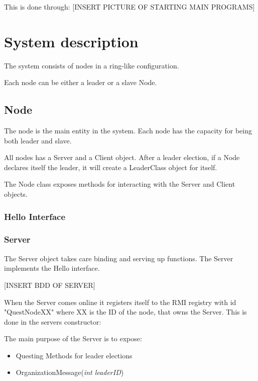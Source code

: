This is done through:
[INSERT PICTURE OF STARTING MAIN PROGRAMS]

\section{System description}
The system consists of nodes in a ring-like configuration.

Each node can be either a leader or a slave Node. 
\subsection{Node}
The node is the main entity in the system. Each node has the capacity for being both leader and slave. 

All nodes has a Server and a Client object. After a leader election, if a Node declares itself the leader, it will create a LeaderClass object for itself. 

The Node class exposes methods for interacting with the Server and Client objects.

\subsubsection{Hello Interface}

\subsubsection{Server}
The Server object takes care binding and serving up functions. The Server implements the Hello interface. 

[INSERT BDD OF SERVER]

When the Server comes online it registers itself to the RMI registry with id "QuestNodeXX" where XX is the ID of the node, that owns the Server. This is done in the servers constructor:

\begin{center}
\end{center}


The main purpose of the Server is to expose:

\begin{itemize}
\item Questing Methods for leader elections
\item OrganizationMessage(\textit{int leaderID})
\end{itemize}

